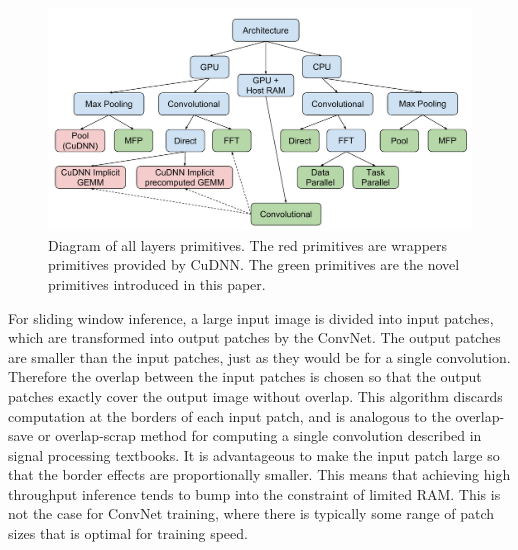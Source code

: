 \documentclass[conference]{./IEEEtran/IEEEtran}
\begin{document}
  \begin{figure}
    \begin{center}
      \includegraphics[width=0.99\columnwidth]{fig/alllayersram.pdf}
    \end{center}
    \caption{Diagram of all layers primitives.  The red primitives are
      wrappers primitives provided by CuDNN.  The green primitives are
      the novel primitives introduced in this paper.}
    \label{fig:layers}
  \end{figure}


For sliding window inference, a large input image is divided into
input patches, which are transformed into output patches by the
ConvNet.  The output patches are smaller than the input patches, just
as they would be for a single convolution. Therefore the overlap
between the input patches is chosen so that the output patches exactly
cover the output image without overlap. This algorithm discards
computation at the borders of each input patch, and is analogous to
the overlap-save or overlap-scrap method for computing a single
convolution described in signal processing textbooks.  It is
advantageous to make the input patch large so that the border effects
are proportionally smaller.  This means that achieving high throughput
inference tends to bump into the constraint of limited RAM.  This is
not the case for ConvNet training, where there is typically some range
of patch sizes that is optimal for training speed.
\end{document}
